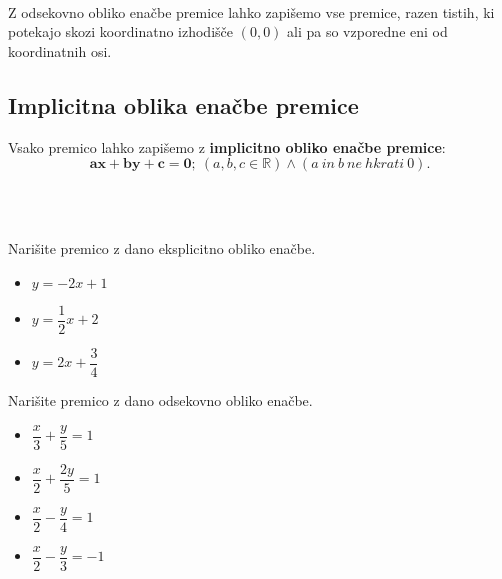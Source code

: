     ~\\
                Z odsekovno obliko enačbe premice lahko zapišemo vse premice, razen tistih, 
                ki potekajo skozi koordinatno izhodišče $(0,0)$ ali pa so vzporedne eni od koordinatnih osi.

        \subsection*{Implicitna oblika enačbe premice}
                Vsako premico lahko zapišemo z \textbf{implicitno obliko enačbe premice}:
                $$\mathbf{ax+by+c=0}; ~(a,b,c\in\mathbb{R}) \land (a~in~b~ne~hkrati~0).$$


~\\~\\




            \begin{naloga}
                Narišite premico z dano eksplicitno obliko enačbe.
                    \begin{itemize}
                        \item $y=-2x+1$
                        \item $y=\dfrac{1}{2}x+2$
                        \item $y=2x+\dfrac{3}{4}$
                    \end{itemize}
            \end{naloga}

            \begin{naloga}
                Narišite premico z dano odsekovno obliko enačbe.
                \begin{multicols}{2}
                    \begin{itemize}
                        \item $\dfrac{x}{3}+\dfrac{y}{5}=1$
                        \item $\dfrac{x}{2}+\dfrac{2y}{5}=1$
                        \item $\dfrac{x}{2}-\dfrac{y}{4}=1$
                        \item $\dfrac{x}{2}-\dfrac{y}{3}=-1$

                    \end{itemize}                        
                \end{multicols}
            \end{naloga}
        


